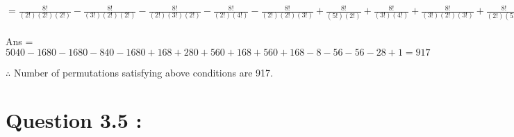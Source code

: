 \documentclass[]{article}
\begin{document}
\paragraph{}
$= \frac{8!}{(2!)(2!)(2!)}-\frac{8!}{(3!)(2!)(2!)}-\frac{8!}{(2!)(3!)(2!)}-\frac{8!}{(2!)(4!)}-\frac{8!}{(2!)(2!)(3!)}+\frac{8!}{(5!)(2!)}+\frac{8!}{(3!)(4!)}+\frac{8!}{(3!)(2!)(3!)}+\frac{8!}{(2!)(5!)}+\frac{8!}{(2!)(3!)(3!)}+\frac{8!}{(2!)(5!)}-\frac{8!}{(7!)}-\frac{8!}{(5!)(3!)}-\frac{8!}{(3!)(5!)}-\frac{8!}{(2!)(6!)}+\frac{8!}{(8!)}$
\paragraph{}
Ans = $5040-1680-1680-840-1680+168+280+560+168+560+168-8-56-56-28+1=917$

\begin{center}
$\therefore$ Number of permutations satisfying above conditions are 917.
\end{center}


\section { Question 3.5 : }
\label{sec:q3}
\end{document}
